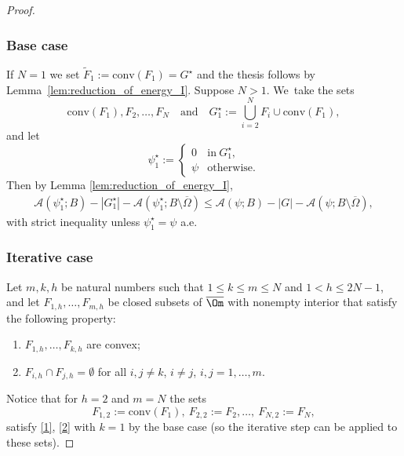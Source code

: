 \skpt
\begin{proof}\vspace*{-\baselineskip}

\subsubsection*{Base case}
If $N=1$ we set $\widetilde F_1:= \mathrm{conv}(F_1)=G^\star$ and the thesis follows by Lemma~\ref{lem:reduction_of_energy_I}. Suppose $N >1$. We~take the sets
\begin{equation}\label{sets_base_case}
\mathrm{conv}(F_1), F_2, \dots, F_N\quad\text{and}\quad G_1^\star:=\bigcup_{i=2}^NF_{i}\cup\mathrm{conv}(F_1),
\end{equation}
and let
\begin{equation*}
\psi_1^\star:=\begin{cases}
0&\text{in}\ G_1^\star,\\
\psi&\text{otherwise}.
\end{cases}
\end{equation*}
Then by Lemma \ref{lem:reduction_of_energy_I},
\begin{align}\label{base_case}
\mathcal A(\psi_1^\star;B)-|G_1^\star|-\mathcal A(\psi_1^\star;B\setminus \overline\Omega)\leq
\mathcal A(\psi;B)-|G|-\mathcal A(\psi;B\setminus \overline\Omega),
\end{align}
with strict inequality unless $\psi_1^\star=\psi$ a.e.

\subsubsection*{Iterative case}
Let $m,k,h$ be natural numbers such that $1\le k\le m\le N$ and $1<h\le 2N-1$, and let $F_{1,h},\dots,F_{m,h}$ be closed subsets of $\overline \Om$
with nonempty interior that satisfy the following property:
\begin{enumerate}[label=($\arabic*$),wide]
\item \label{1}$F_{1,h},\dots,F_{k,h}$ are convex;
\item\label{2} $F_{i,h}\cap F_{j,h}=\emptyset$ for all $i, j\ne k$, $i\ne j$, $i,j=1,\dots,m$.
\end{enumerate}
Notice that for $h=2$ and $m=N$ the sets
\begin{equation*}
F_{1,2}:=\mathrm{conv}(F_1),\ F_{2,2}:=F_2,\dots,\ F_{N,2}:=F_N,
\end{equation*}
satisfy \ref{1}, \ref{2} with $k=1$ by the base case (so the iterative step can be applied to these sets).


\end{proof}
